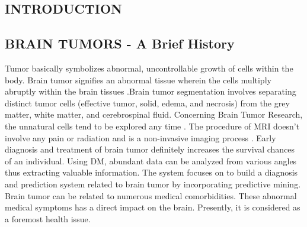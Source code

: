 \documentclass[a4paper, 12pt]{report}
\begin{document}

\newpage
\begin{spacing}{1.5}
\chapter{INTRODUCTION} 

\section{BRAIN TUMORS - A Brief History}

\par Tumor basically symbolizes abnormal, uncontrollable growth of cells within the body. Brain tumor signifies an abnormal tissue wherein the cells multiply abruptly within the brain tissues \cite{alic}.Brain tumor segmentation involves separating distinct tumor cells (effective tumor, solid, edema, and necrosis) from the grey matter, white matter, and cerebrospinal fluid. Concerning Brain Tumor Research, the unnatural cells tend to be explored any time \cite{nellyg}. The procedure of MRI doesn’t involve any pain or radiation and is a non-invasive imaging process \cite{ayun}. Early diagnosis and treatment of brain tumor definitely increases the survival chances of an individual. Using DM, abundant data can be analyzed from various angles thus extracting valuable information. The system focuses on to build a diagnosis and prediction system related to brain tumor by incorporating predictive mining. Brain tumor can be related to numerous medical comorbidities. These abnormal medical symptoms has a direct impact on the brain. Presently, it is considered as a foremost health issue.\\


\end{spacing}
\end{document}
